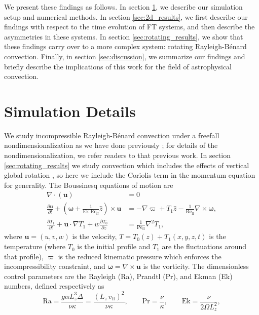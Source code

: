 \documentclass[aps, pre, onecolumn, nofootinbib, notitlepage, groupedaddress, amsfonts, amssymb, amsmath, longbibliography, superscriptaddress]{revtex4-1}
\newcommand{\Div}[1]{\ensuremath{\nabla\cdot\left( #1\right)}}
\newcommand{\grad}{\ensuremath{\nabla}}
\newcommand{\RB}{Rayleigh-B\'{e}nard }
\newcommand{\Reff}{\ensuremath{\text{Re}_{\text{ff}}}}
\newcommand{\Peff}{\ensuremath{\text{Pe}_{\text{ff}}}}
\begin{document}
We present these findings as follows.
In section \ref{sec:simulations}, we describe our simulation setup and numerical methods.
In section \ref{sec:2d_results}, we first describe our findings with respect to the time evolution of FT systems, and then describe the asymmetries in these systems.
In section \ref{sec:rotating_results}, we show that these findings carry over to a more complex system: rotating \RB convection.
Finally, in section \ref{sec:discussion}, we summarize our findings and briefly describe the implications of this work for the field of astrophysical convection.


\section{Simulation Details}
\label{sec:simulations}
We study incompressible \RB convection under a freefall nondimensionalization as we have done previously \cite{anders&all2018}; for details of the nondimensionalization, we refer readers to that previous work.
In section \ref{sec:rotating_results} we study convection which includes the effects of vertical global rotation \cite{julien&all1996}, so here we include the Coriolis term in the momentum equation for generality.
The Boussinesq equations of motion are
\begin{align}
\Div{\bm{u}} &= 0
	\label{eqn:incompressible}
\\
\frac{\partial \bm{u}}{\partial t} + \left(\bm{\omega} + \frac{1}{\text{Ek }\Reff}\hat{z}\right)\times\bm{u} 
&= - \grad \varpi + T_1\hat{z} - \frac{1}{\Reff}\grad\times\bm{\omega},
	\label{eqn:bouss_momentum}
\\
\frac{\partial T_1}{\partial t}  + \bm{u}\cdot\grad T_1 + w \frac{\partial T_0}{\partial z} 
&= \frac{1}{\Peff}\grad^2 T_1,
	\label{eqn:bouss_energy}
\end{align}
where $\bm{u} = (u, v, w)$ is the velocity, $T = T_0(z) + T_1(x, y, z, t)$ is the temperature (where $T_0$ is the initial profile and $T_1$ are the fluctuations around that profile), $\varpi$ is the reduced kinematic pressure \cite{anders&all2018} which enforces the incompressibility constraint, and $\bm{\omega} = \grad \times \bm{u}$ is the vorticity.
The dimensionless control parameters are the Rayleigh (Ra), Prandtl (Pr), and Ekman (Ek) numbers, defined respectively as
\begin{equation}
\text{Ra} = \frac{g \alpha L_z^3 \Delta}{\nu\kappa} = \frac{(L_z\,v_{\text{ff}})^2}{\nu\kappa}, \qquad \text{Pr} = \frac{\nu}{\kappa}, \qquad \text{Ek} = \frac{\nu}{2\Omega L_z^2},
\end{equation}
\end{document}

